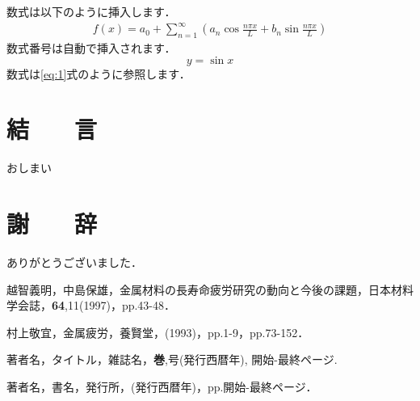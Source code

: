 \documentclass{jsarticle}
\begin{document}
数式は以下のように挿入します．
\begin{eqnarray}
f(x)=a_0+\sum_{n=1}^\infty (a_n\cos\frac{n\pi x}{L}+b_n\sin\frac{n\pi x}{L})
\end{eqnarray}
数式番号は自動で挿入されます．
\begin{equation}
    y = \sin x  \label{eq:1}
\end{equation}
数式は\eqref{eq:1}式のように参照します．


\section{結　　言}
おしまい

\section*{謝　　辞}
ありがとうございました．

\begin{thebibliography}{99}
越智義明，中島保雄，金属材料の長寿命疲労研究の動向と今後の課題，日本材料学会誌，{\bfseries 64},11(1997)，pp.43-48．

村上敬宜，金属疲労，養賢堂，(1993)，pp.1-9，pp.73-152．

著者名，タイトル，雑誌名，{\bfseries 巻},号(発行西暦年), 開始-最終ページ.

著者名，書名，発行所，(発行西暦年)，pp.開始-最終ページ．
\end{thebibliography}
\end{document}
